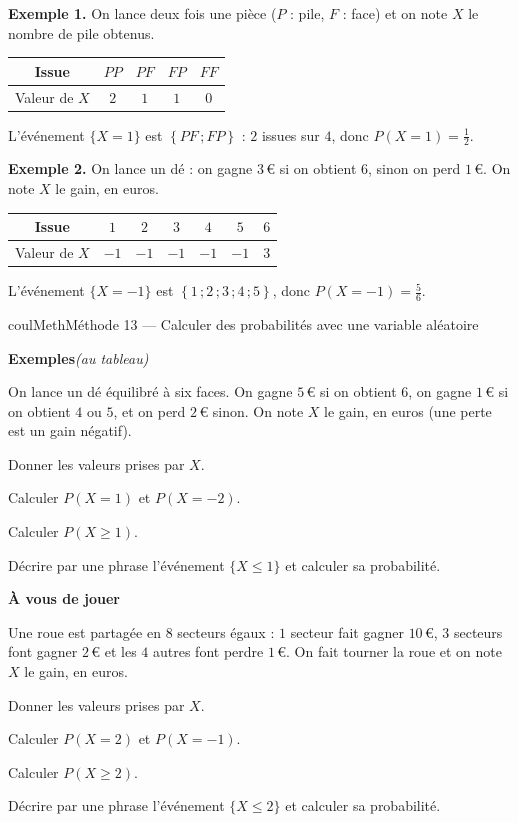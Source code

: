 \documentclass[11pt,a4paper]{article}
\makeatletter
\renewcommand{\le}{\leqslant}
\renewcommand{\ge}{\geqslant}
\newcommand{\lycee@ens}[1]{\left\{#1\right\}}
\providecommand{\ens}{\lycee@ens}}
\newcounter{lycee@signet}
\newcommand{\signet}[3][]{\stepcounter{lycee@signet}%
  \edef\lycee@dest{\if\relax\detokenize{#1}\relax
    signet.\arabic{lycee@signet}\else#1\fi}%
  \hypertarget{\lycee@dest}{}\bookmark[level=#2,dest=\lycee@dest]{#3}}
\newcounter{methode}
\newenvironment{methodebox}[1][Méthode]{\stepcounter{methode}%
  \begin{boitecours}[phantom={\signet[methode-\arabic{methode}]{2}{#1}}]{coulMeth}{#1}}%
  {\end{boitecours}}
\newcommand{\etape}[1]{\par\smallskip\textbf{\color{coulMeth}#1}\par\nobreak\smallskip}
\newcommand{\autableau}{\hfill{\footnotesize\itshape\color{black!45}(au tableau)}}
\newcommand{\etapeexemples}{%
    \par\smallskip\textbf{\color{coulMeth}Exemples}\autableau\par\nobreak\smallskip}
\makeatother
\begin{document}
\textbf{Exemple 1.} On lance deux fois une pièce ($P$ : pile, $F$ : face) et on note
$X$ le nombre de \og pile\fg{} obtenus.
\begin{center}
\renewcommand{\arraystretch}{1.4}
\begin{tabular}{|c|c|c|c|c|}
\hline
Issue & $PP$ & $PF$ & $FP$ & $FF$\\\hline
Valeur de $X$ & $2$ & $1$ & $1$ & $0$\\\hline
\end{tabular}
\end{center}
L'événement $\{X=1\}$ est $\ens{PF\,;FP}$ : $2$ issues sur $4$, donc $P(X=1)=\frac{1}{2}$.

\medskip
\textbf{Exemple 2.} On lance un dé : on gagne $3$\,€ si on obtient $6$, sinon on perd
$1$\,€. On note $X$ le gain, en euros.
\begin{center}
\renewcommand{\arraystretch}{1.4}
\begin{tabular}{|c|c|c|c|c|c|c|}
\hline
Issue & $1$ & $2$ & $3$ & $4$ & $5$ & $6$\\\hline
Valeur de $X$ & $-1$ & $-1$ & $-1$ & $-1$ & $-1$ & $3$\\\hline
\end{tabular}
\end{center}
L'événement $\{X=-1\}$ est $\ens{1\,;2\,;3\,;4\,;5}$, donc $P(X=-1)=\frac{5}{6}$.

\begin{methodebox}[Méthode 13 --- Calculer des probabilités avec une variable aléatoire]
\etapeexemples
On lance un dé équilibré à six faces. On gagne $5$\,€ si on obtient $6$, on gagne
$1$\,€ si on obtient $4$ ou $5$, et on perd $2$\,€ sinon. On note $X$ le gain, en euros
(une perte est un gain négatif).
\begin{questions}[label=\alph*)]
  \item Donner les valeurs prises par $X$.
  \item Calculer $P(X=1)$ et $P(X=-2)$.
  \item Calculer $P(X\ge 1)$.
  \item Décrire par une phrase l'événement $\{X\le 1\}$ et calculer sa probabilité.
\end{questions}

\etape{À vous de jouer}
Une roue est partagée en $8$ secteurs égaux : $1$ secteur fait gagner $10$\,€, $3$
secteurs font gagner $2$\,€ et les $4$ autres font perdre $1$\,€. On fait tourner la
roue et on note $X$ le gain, en euros.
\begin{questions}[label=\alph*)]
  \item Donner les valeurs prises par $X$.
  \item Calculer $P(X=2)$ et $P(X=-1)$.
  \item Calculer $P(X\ge 2)$.
  \item Décrire par une phrase l'événement $\{X\le 2\}$ et calculer sa probabilité.
\end{questions}

\end{methodebox}
\end{document}
